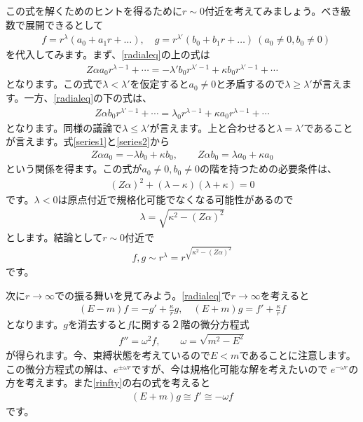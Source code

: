 \documentclass[report,paper=a4, fontsize=12pt, line_length=16cm, number_of_lines=33,dvipdfmx]{jlreq}
\numberwithin{equation}{chapter}
\begin{document}
この式を解くためのヒントを得るために$r\sim 0$付近を考えてみましょう。べき級数で展開できるとして
\begin{align}
  &f=r^{\lambda}(a_0+a_1r+\dots),\quad g=r^{\lambda'}(b_0+b_1r+\dots)\ (a_0\ne 0,b_0\ne 0)
\end{align}
を代入してみます。まず、\eqref{radialeq}の上の式は
\begin{align}
  Z\alpha a_0r^{\lambda-1}+\cdots = -\lambda'b_0r^{\lambda'-1}+\kappa b_0r^{\lambda'-1}+\cdots
  \label{series1}
\end{align}
となります。この式で$\lambda<\lambda'$を仮定すると$a_0\ne 0$と矛盾するので$\lambda \ge \lambda'$が言えます。一方、\eqref{radialeq}の下の式は、
\begin{align}
  Z\alpha b_0r^{\lambda'-1}+\cdots = \lambda_0r^{\lambda-1}+\kappa a_0r^{\lambda-1}+\cdots
  \label{series2}
\end{align}
となります。同様の議論で$\lambda\le \lambda'$が言えます。上と合わせると$\lambda=\lambda'$であることが言えます。式\eqref{series1}と\eqref{series2}から
\begin{align}
  Z\alpha a_0=-\lambda b_0+\kappa b_0,\qquad
  Z\alpha b_0=\lambda a_0+\kappa a_0
\end{align}
という関係を得ます。この式が$a_0\ne 0,b_0\ne 0$の階を持つための必要条件は、
\begin{align*}
  (Z\alpha)^{2}+(\lambda-\kappa)(\lambda+\kappa)=0
\end{align*}
です。$\lambda<0$は原点付近で規格化可能でなくなる可能性があるので
\begin{align}
  \lambda=\sqrt{\kappa^2-(Z\alpha)^2}
\end{align}
とします。結論として$r\sim 0$付近で
\begin{align}
  f,g\sim r^{\lambda}=r^{\sqrt{\kappa^2-(Z\alpha)^2}}
\end{align}
です。

次に$r\to\infty$での振る舞いを見てみよう。\eqref{radialeq}で$r\to\infty$を考えると
\begin{align}
  (E-m)f=-g'+\frac{\kappa}{r}g,\quad
  (E+m)g=f'+\frac{\kappa}{r}f\label{rinfty}
\end{align}
となります。$g$を消去すると$f$に関する２階の微分方程式
\begin{align}
  f''=\omega^2f,\qquad \omega=\sqrt{m^2-E^2}
\end{align}
が得られます。今、束縛状態を考えているので$E<m$であることに注意します。
この微分方程式の解は、$e^{\pm \omega r}$ですが、今は規格化可能な解を考えたいので
$e^{-\omega r}$の方を考えます。また\eqref{rinfty}の右の式を考えると
\begin{align}
  (E+m)g\cong f'\cong -\omega f
\end{align}
です。
\end{document}
